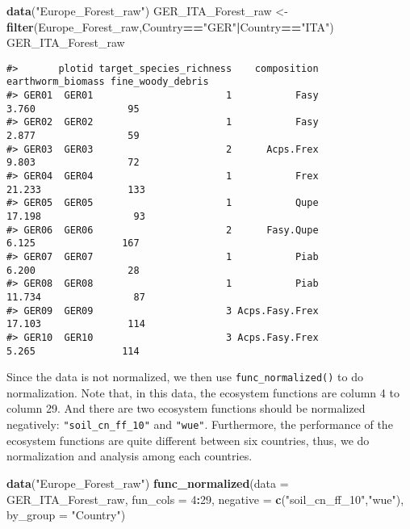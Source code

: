 \documentclass[
]{article}
\newenvironment{Shaded}{\begin{snugshade}}{\end{snugshade}}
\newcommand{\AttributeTok}[1]{\textcolor[rgb]{0.13,0.29,0.53}{#1}}
\newcommand{\DecValTok}[1]{\textcolor[rgb]{0.00,0.00,0.81}{#1}}
\newcommand{\FunctionTok}[1]{\textcolor[rgb]{0.13,0.29,0.53}{\textbf{#1}}}
\newcommand{\NormalTok}[1]{#1}
\newcommand{\OtherTok}[1]{\textcolor[rgb]{0.56,0.35,0.01}{#1}}
\newcommand{\SpecialCharTok}[1]{\textcolor[rgb]{0.81,0.36,0.00}{\textbf{#1}}}
\newcommand{\StringTok}[1]{\textcolor[rgb]{0.31,0.60,0.02}{#1}}
\begin{document}
\begin{Shaded}
\begin{Highlighting}[]
\FunctionTok{data}\NormalTok{(}\StringTok{"Europe\_Forest\_raw"}\NormalTok{)}
\NormalTok{GER\_ITA\_Forest\_raw }\OtherTok{\textless{}{-}} \FunctionTok{filter}\NormalTok{(Europe\_Forest\_raw,Country}\SpecialCharTok{==}\StringTok{"GER"}\SpecialCharTok{|}\NormalTok{Country}\SpecialCharTok{==}\StringTok{"ITA"}\NormalTok{)}
\NormalTok{GER\_ITA\_Forest\_raw}
\end{Highlighting}
\end{Shaded}

\begin{verbatim}
#>       plotid target_species_richness    composition earthworm_biomass fine_woody_debris
#> GER01  GER01                       1           Fasy             3.760                95
#> GER02  GER02                       1           Fasy             2.877                59
#> GER03  GER03                       2      Acps.Frex             9.803                72
#> GER04  GER04                       1           Frex            21.233               133
#> GER05  GER05                       1           Qupe            17.198                93
#> GER06  GER06                       2      Fasy.Qupe             6.125               167
#> GER07  GER07                       1           Piab             6.200                28
#> GER08  GER08                       1           Piab            11.734                87
#> GER09  GER09                       3 Acps.Fasy.Frex            17.103               114
#> GER10  GER10                       3 Acps.Fasy.Frex             5.265               114
\end{verbatim}

Since the data is not normalized, we then use
\texttt{func\_normalized()} to do normalization. Note that, in this
data, the ecosystem functions are column 4 to column 29. And there are
two ecosystem functions should be normalized negatively:
\texttt{"soil\_cn\_ff\_10"} and \texttt{"wue"}. Furthermore, the
performance of the ecosystem functions are quite different between six
countries, thus, we do normalization and analysis among each countries.

\begin{Shaded}
\begin{Highlighting}[]
\FunctionTok{data}\NormalTok{(}\StringTok{"Europe\_Forest\_raw"}\NormalTok{)}
\FunctionTok{func\_normalized}\NormalTok{(}\AttributeTok{data =}\NormalTok{ GER\_ITA\_Forest\_raw, }\AttributeTok{fun\_cols =} \DecValTok{4}\SpecialCharTok{:}\DecValTok{29}\NormalTok{,}
                \AttributeTok{negative =} \FunctionTok{c}\NormalTok{(}\StringTok{"soil\_cn\_ff\_10"}\NormalTok{,}\StringTok{"wue"}\NormalTok{), }\AttributeTok{by\_group =} \StringTok{"Country"}\NormalTok{)}
\end{Highlighting}
\end{Shaded}
\end{document}
